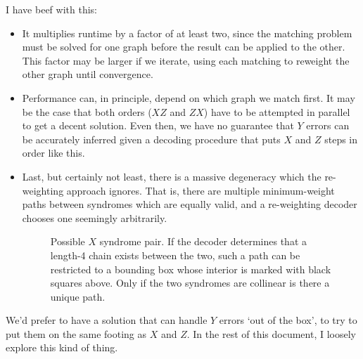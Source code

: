 \documentclass[a4paper, english]{scrartcl}
\begin{document}
I have beef with this:
\begin{itemize}
\item It multiplies runtime by a factor of at least two, since the matching problem must be solved for one graph before the result can be applied to the other. 
This factor may be larger if we iterate, using each matching to reweight the other graph until convergence.
\item Performance can, in principle, depend on which graph we match first. It may be the case that both orders ($XZ$ and $ZX$) have to be attempted in parallel to get a decent solution. 
Even then, we have no guarantee that $Y$ errors can be accurately inferred given a decoding procedure that puts $X$ and $Z$ steps in order like this. 
\item Last, but certainly not least, there is a massive degeneracy which the re-weighting approach ignores. 
That is, there are multiple minimum-weight paths between syndromes which are equally valid, and a re-weighting decoder chooses one seemingly arbitrarily. 
\begin{figure}[!h]
\centering
{}
\caption{Possible $X$ syndrome pair. 
If the decoder determines that a length-4 chain exists between the two, such a path can be restricted to a bounding box whose interior is marked with black squares above. 
Only if the two syndromes are collinear is there a unique path.}
\end{figure}
\end{itemize}
We'd prefer to have a solution that can handle $Y$ errors `out of the box', to try to put them on the same footing as $X$ and $Z$. 
In the rest of this document, I loosely explore this kind of thing. 
\end{document}
